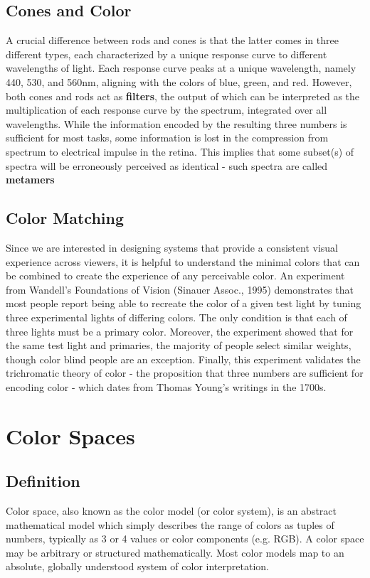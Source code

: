 \documentclass{article}
\begin{document}
\subsection{Cones and Color}
A crucial difference between rods and cones is that the latter comes in three different types, each characterized by a unique response curve to different wavelengths of light. Each response curve peaks at a unique wavelength, namely 440, 530, and 560nm, aligning with the colors of blue, green, and red. However, both cones and rods act as \textbf{filters}, the output of which can be interpreted as the multiplication of each response curve by the spectrum, integrated over all wavelengths. While the information encoded by the resulting three numbers is sufficient for most tasks, some information is lost in the compression from spectrum to electrical impulse in the retina. This implies that some subset(s) of spectra will be erroneously perceived as identical - such spectra are called \textbf{metamers}

\subsection{Color Matching}
Since we are interested in designing systems that provide a consistent visual experience across viewers, it is helpful to understand the minimal colors that can be combined to create the experience of any perceivable color. An experiment from Wandell's Foundations of Vision (Sinauer Assoc., 1995) demonstrates that most people report being able to recreate the color of a given test light by tuning three experimental lights of differing colors. The only condition is that each of three lights must be a primary color. Moreover, the experiment showed that for the same test light and primaries,	the majority of people select similar weights, though color blind people are an exception. Finally, this experiment validates the trichromatic theory of color - the proposition that three	numbers	are	sufficient	for	encoding color -  which dates from Thomas Young's writings in the 1700s.


\section{Color Spaces}
\subsection{Definition} 
Color space, also known as the color model (or color system), is an abstract mathematical model which simply describes the range of colors as tuples of numbers, typically as 3 or 4 values or color components (e.g. RGB). A color space may be arbitrary or structured mathematically. Most color models map to an absolute, globally understood system of color interpretation. 
\end{document}
